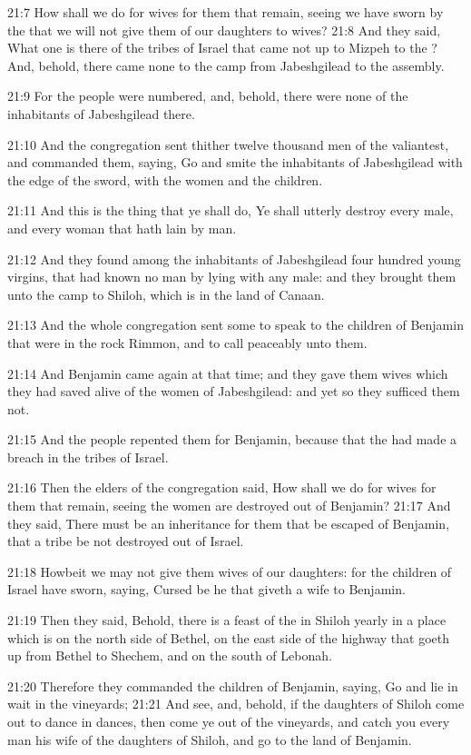 21:7 How shall we do for wives for them that remain, seeing we have sworn by the \LORD that we will not give them of our daughters to wives?  21:8 And they said, What one is there of the tribes of Israel that came not up to Mizpeh to the \LORD? And, behold, there came none to the camp from Jabeshgilead to the assembly.

21:9 For the people were numbered, and, behold, there were none of the inhabitants of Jabeshgilead there.

21:10 And the congregation sent thither twelve thousand men of the valiantest, and commanded them, saying, Go and smite the inhabitants of Jabeshgilead with the edge of the sword, with the women and the children.

21:11 And this is the thing that ye shall do, Ye shall utterly destroy every male, and every woman that hath lain by man.

21:12 And they found among the inhabitants of Jabeshgilead four hundred young virgins, that had known no man by lying with any male: and they brought them unto the camp to Shiloh, which is in the land of Canaan.

21:13 And the whole congregation sent some to speak to the children of Benjamin that were in the rock Rimmon, and to call peaceably unto them.

21:14 And Benjamin came again at that time; and they gave them wives which they had saved alive of the women of Jabeshgilead: and yet so they sufficed them not.

21:15 And the people repented them for Benjamin, because that the \LORD had made a breach in the tribes of Israel.

21:16 Then the elders of the congregation said, How shall we do for wives for them that remain, seeing the women are destroyed out of Benjamin?  21:17 And they said, There must be an inheritance for them that be escaped of Benjamin, that a tribe be not destroyed out of Israel.

21:18 Howbeit we may not give them wives of our daughters: for the children of Israel have sworn, saying, Cursed be he that giveth a wife to Benjamin.

21:19 Then they said, Behold, there is a feast of the \LORD in Shiloh yearly in a place which is on the north side of Bethel, on the east side of the highway that goeth up from Bethel to Shechem, and on the south of Lebonah.

21:20 Therefore they commanded the children of Benjamin, saying, Go and lie in wait in the vineyards; 21:21 And see, and, behold, if the daughters of Shiloh come out to dance in dances, then come ye out of the vineyards, and catch you every man his wife of the daughters of Shiloh, and go to the land of Benjamin.

